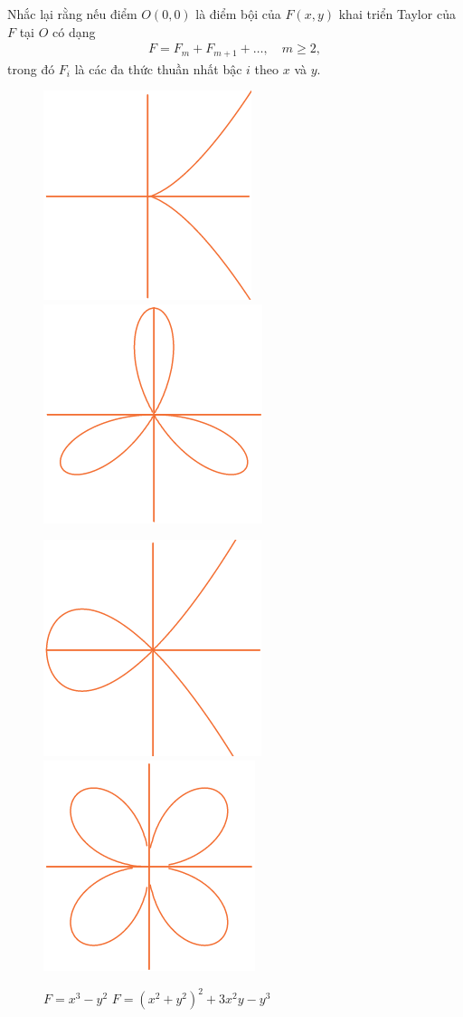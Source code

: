\begin{multicols}{2}
	\vskip 0.1cm
	Nhắc lại rằng nếu điểm $O(0,0)$ là điểm bội của $F(x,y)$ khai triển Taylor của $F$ tại $O$ có dạng
	\begin{align*}
		F=F_m+F_{m+1}+\ldots, \quad m\geq 2,
	\end{align*}
	trong đó $F_i$ là các đa thức thuần nhất bậc $i$ theo $x$ và $y$. 
	\begin{figure}[H]
		\vspace*{-10pt}
		\centering
		\captionsetup{labelformat= empty, justification=centering}
		\includegraphics[height=0.4\linewidth]{4a}\quad\quad
		\includegraphics[height=0.4\linewidth]{4b}
		\caption{\small\quad\quad$F=x^3-y^2$ \quad\quad$F\!=\!(x^2 \!+\! y^2)^2 \!+\! 3x^2y\!-\!y^3$}
		\includegraphics[height=0.4\linewidth]{4c}\quad\quad
		\includegraphics[height=0.4\linewidth]{4d}

\end{figure}
\end{multicols}
